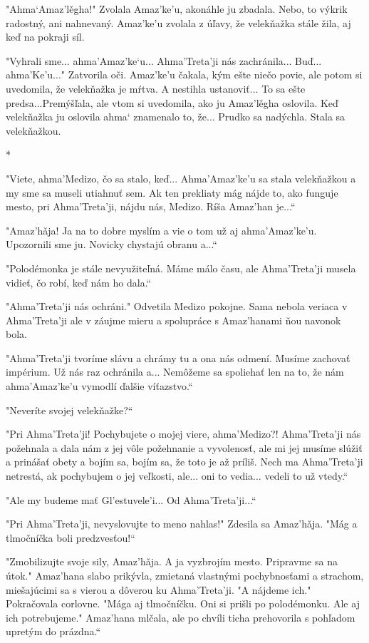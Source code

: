 \documentclass{book}
\begin{document}
"$ $Ahma‘Amaz'le\v{}gha!"$ $ Zvolala Amaz'ke'u, akonáhle ju zbadala. Nebo, to výkrik radostný, ani nahnevaný. Amaz'ke'u zvolala z úľavy, že velekňažka stále žila, aj keď na pokraji síl.

"$ $Vyhrali sme... ahma'Amaz'ke‘u... Ahma'Treta'ji nás zachránila... Buď... ahma'Ke'u..."$ $ Zatvorila oči. Amaz'ke'u čakala, kým ešte niečo povie, ale potom si uvedomila, že velekňažka je mŕtva. A nestihla ustanoviť... To sa ešte predsa...Premýšľala, ale vtom si uvedomila, ako ju Amaz'le\v{}gha oslovila. Keď velekňažka ju oslovila ahma‘ znamenalo to, že... Prudko sa nadýchla. Stala sa velekňažkou.

\begin{center}
*
\end{center}

"$ $Viete, ahma'Medizo, čo sa stalo, keď... Ahma'Amaz'ke'u sa stala velekňažkou a my sme sa museli utiahnuť sem. Ak ten prekliaty mág nájde to, ako funguje mesto, pri Ahma'Treta'ji, nájdu nás, Medizo. Ríša Amaz'han je...“

"$ $Amaz'ha\v{}ja! Ja na to dobre myslím a vie o tom už aj ahma'Amaz'ke'u. Upozornili sme ju. Novicky chystajú obranu a...“

"$ $Polodémonka je stále nevyužiteľná. Máme málo času, ale Ahma'Treta'ji musela vidieť, čo robí, keď nám ho dala.“

"$ $Ahma'Treta'ji nás ochráni."$ $ Odvetila Medizo pokojne. Sama nebola veriaca v Ahma'Treta'ji ale v záujme mieru a spolupráce s Amaz'hanami ňou navonok bola.

"$ $Ahma'Treta'ji tvoríme slávu a chrámy tu a ona nás odmení. Musíme zachovať impérium. Už nás raz ochránila a... Nemôžeme sa spoliehať len na to, že nám ahma'Amaz'ke'u vymodlí ďalšie víťazstvo.“

"$ $Neveríte svojej velekňažke?“

"$ $Pri Ahma'Treta'ji! Pochybujete o mojej viere, ahma'Medizo?! Ahma'Treta'ji nás požehnala a dala nám z jej vôle požehnanie a vyvolenosť, ale mi jej musíme slúžiť a prinášať obety a bojím sa, bojím sa, že toto je až príliš. Nech ma Ahma'Treta'ji netrestá, ak pochybujem o jej veľkosti, ale... oni to vedia... vedeli to už vtedy.“

"$ $Ale my budeme mať Gl'estuvele'i... Od Ahma'Treta'ji...“

"$ $Pri Ahma'Treta'ji, nevyslovujte to meno nahlas!"$ $ Zdesila sa Amaz'ha\v{}ja. "$ $Mág a tlmočníčka boli predzvesťou!“

"$ $Zmobilizujte svoje sily, Amaz'ha\v{}ja. A ja vyzbrojím mesto. Pripravme sa na útok."$ $ Amaz'hana slabo prikývla, zmietaná vlastnými pochybnosťami a strachom, miešajúcimi sa s vierou a dôverou ku Ahma'Treta'ji. "$ $A nájdeme ich."$ $ Pokračovala corlovne. "$ $Mága aj tlmočníčku. Oni si prišli po polodémonku. Ale aj ich potrebujeme."$ $ Amaz'hana mlčala, ale po chvíli ticha prehovorila s pohľadom upretým do prázdna.“
\end{document}
